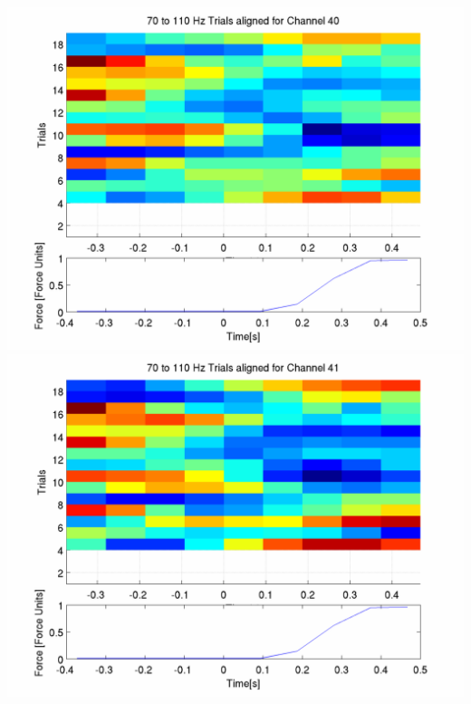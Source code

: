 \documentclass[12pt]{article}
\begin{document}
\includegraphics[scale=0.2]{log_plot_3_aligned_trials.png}
\includegraphics[scale=0.2]{log_plot_4_aligned_trials.png}
\end{document}
